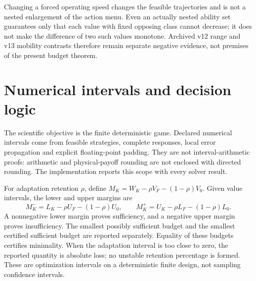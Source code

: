 Changing a forced operating speed changes the feasible trajectories and is
not a nested enlargement of the action menu. Even an actually nested ability
set guarantees only that each value with fixed opposing class cannot decrease;
it does not make the difference of two such values monotone. Archived v12
range and v13 mobility contrasts therefore remain separate negative evidence,
not premises of the present budget theorem.

\section{Numerical intervals and decision logic}
The scientific objective is the finite deterministic game. Declared numerical
intervals come from feasible strategies, complete responses, local error
propagation and explicit floating-point padding. They are not interval-arithmetic
proofs: arithmetic and physical-payoff rounding are not enclosed with directed
rounding. The implementation reports this scope with every solver result.

For adaptation retention $\rho$, define
$M_K=W_K-\rho V_F-(1-\rho)V_0$. Given value intervals, the lower and upper
margins are
\[
 M_K^- = L_K-\rho U_F-(1-\rho)U_0,\qquad
 M_K^+ = U_K-\rho L_F-(1-\rho)L_0.
\]
A nonnegative lower margin proves sufficiency, and a negative upper margin
proves insufficiency. The smallest possibly sufficient budget and the smallest
certified sufficient budget are reported separately. Equality of these budgets
certifies minimality. When the adaptation interval is too close to zero, the
reported quantity is absolute loss; no unstable retention percentage is formed.
These are optimization intervals on a deterministic finite design, not sampling
confidence intervals.
